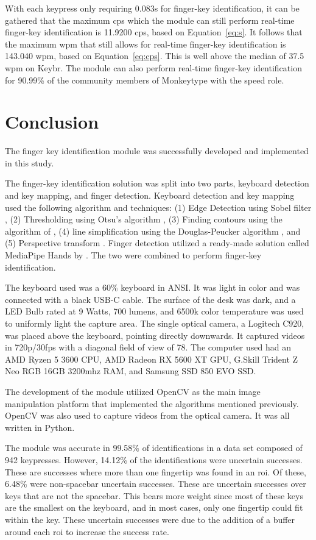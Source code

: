 \documentclass[preprint,12pt,authoryear]{elsarticle}
\begin{document}
With each keypress only requiring 0.083s for finger-key identification, it can
be gathered that the maximum \ac{cps} which the module can still perform
real-time finger-key identification is 11.9200 \ac{cps}, based on
Equation~\ref{eq:s}. It follows that the maximum \ac{wpm} that still allows for
real-time finger-key identification is 143.040 \ac{wpm}, based on
Equation~\ref{eq:cps}. This is well above the median of 37.5 \ac{wpm} on Keybr.
The module can also perform real-time finger-key identification for 90.99\% of the
community members of Monkeytype with the speed role.

\section{Conclusion}
The finger key identification module was successfully developed and implemented
in this study.

The finger-key identification solution was split into two parts, keyboard
detection and key mapping, and finger detection. Keyboard detection and key
mapping used the following algorithm and techniques: (1) Edge Detection using
Sobel filter \citep{sobel2014}, (2) Thresholding using Otsu's algorithm
\citep{otsu}, (3) Finding contours using the algorithm of \citet{contours}, (4)
line simplification using the Douglas-Peucker algorithm \citep{douglas-peucker},
and (5) Perspective transform \citep{opencv-docs}. Finger detection utilized a
ready-made solution called MediaPipe Hands by \citet{mediapipe}. The two were
combined to perform finger-key identification.

The keyboard used was a 60\% keyboard in ANSI. It was light in color and was
connected with a black USB-C cable. The surface of the desk was dark, and a LED
Bulb rated at 9 Watts, 700 lumens, and 6500k color temperature was used to
uniformly light the capture area. The single optical camera, a Logitech C920,
was placed above the keyboard, pointing directly downwards. It captured videos
in 720p/30fps with a diagonal field of view of 78\degree. The
computer used had an AMD Ryzen 5 3600 CPU, AMD Radeon RX 5600 XT GPU, G.Skill
Trident Z Neo RGB 16GB 3200mhz RAM, and Samsung SSD 850 EVO SSD.

The development of the module utilized OpenCV as the main image manipulation
platform that implemented the algorithms mentioned previously. OpenCV was also
used to capture videos from the optical camera. It was all written in Python.

The module was accurate in 99.58\% of identifications in a data set composed of
942 keypresses. However, 14.12\% of the identifications were uncertain
successes. These are successes where more than one fingertip was found in an
\ac{roi}. Of these, 6.48\% were non-spacebar uncertain successes. These are
uncertain successes over keys that are not the spacebar. This bears more weight
since most of these keys are the smallest on the keyboard, and in most cases,
only one fingertip could fit within the key. These uncertain successes were due
to the addition of a buffer around each \ac{roi} to increase the success rate.
\end{document}
